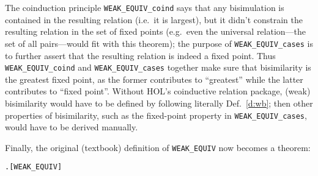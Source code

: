 The coinduction principle \texttt{WEAK_EQUIV_coind} says that any
bisimulation is contained in the resulting relation (i.e.~it is
largest), but it didn't constrain the resulting relation in the set of
fixed points (e.g.~even the universal relation---the set of all
pairs---would fit with this theorem); the
purpose of \texttt{WEAK_EQUIV_cases} is to
further assert that the resulting relation is indeed a
fixed point. Thus \texttt{WEAK_EQUIV_coind} and \texttt{WEAK_EQUIV_cases}
together make sure that bisimilarity is the greatest
fixed point, as
the former contributes to ``greatest'' while the latter
contributes to ``fixed point''.
%
Without HOL's coinductive relation package, (weak) bisimilarity
would have to be defined by following literally
Def.~\ref{d:wb};  then other properties of bisimilarity, such
as the fixed-point property in \texttt{WEAK_EQUIV_cases}, would have to be
derived manually.

Finally, the original (textbook) definition of \texttt{WEAK_EQUIV} now
becomes a theorem:
\begin{alltt}
\HOLTokenTurnstile{}  \HOLSymConst{\HOLTokenWeakEQ}  \HOLSymConst{\HOLTokenEquiv{}} \HOLSymConst{\HOLTokenExists{}}.    \HOLSymConst{\HOLTokenConj{}}  \hfill{[WEAK_EQUIV]}
\end{alltt}


